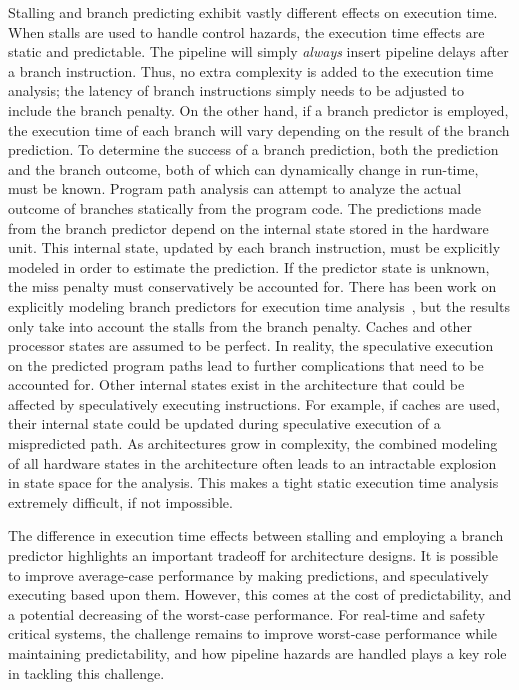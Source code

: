 Stalling and branch predicting exhibit vastly different effects on execution time.    
When stalls are used to handle control hazards, the execution time effects are static and predictable.   
The pipeline will simply \emph{always} insert pipeline delays after a branch instruction.
Thus, no extra complexity is added to the execution time analysis; the latency of branch instructions simply needs to be adjusted to include the branch penalty.
On the other hand, if a branch predictor is employed, the execution time of each branch will vary depending on the result of the branch prediction.  
To determine the success of a branch prediction, both the prediction and the branch outcome, both of which can dynamically change in run-time, must be known.   
Program path analysis can attempt to analyze the actual outcome of branches statically from the program code. 
The predictions made from the branch predictor depend on the internal state stored in the hardware unit.
This internal state, updated by each branch instruction, must be explicitly modeled in order to estimate the prediction. 
If the predictor state is unknown, the miss penalty must conservatively be accounted for.
There has been work on explicitly modeling branch predictors for execution time analysis~\cite{Mitra_branch_wcet_2002}, but the results only take into account the stalls from the branch penalty. 
Caches and other processor states are assumed to be perfect. 
In reality, the speculative execution on the predicted program paths lead to further complications that need to be accounted for.
Other internal states exist in the architecture that could be affected by speculatively executing instructions.
For example, if caches are used, their internal state could be updated during speculative execution of a mispredicted path.
As architectures grow in complexity, the combined modeling of all hardware states in the architecture often leads to an intractable explosion in state space for the analysis.    
This makes a tight static execution time analysis extremely difficult, if not impossible.

The difference in execution time effects between stalling and employing a branch predictor highlights an important tradeoff for architecture designs.    
It is possible to improve average-case performance by making predictions, and speculatively executing based upon them.
However, this comes at the cost of predictability, and a potential decreasing of the worst-case performance.  
For real-time and safety critical systems, the challenge remains to improve worst-case performance while maintaining predictability, and how pipeline hazards are handled plays a key role in tackling this challenge. 
 
